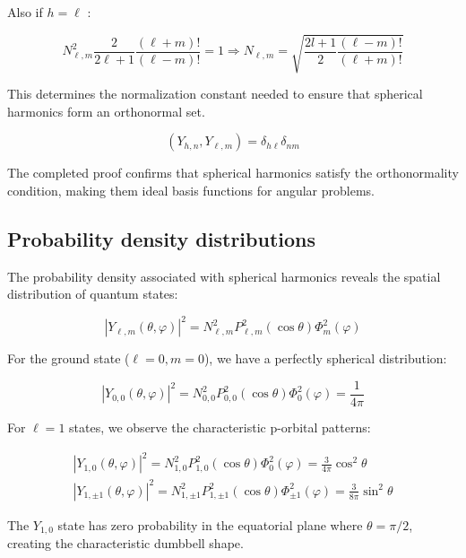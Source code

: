 \documentclass[italian]{HKNdocument}
\begin{document}
Also if $h=\ell$ :

\begin{equation}
N_{\ell, m}^{2} \frac{2}{2 \ell+1} \frac{(\ell+m)!}{(\ell-m)!}=1 \Longrightarrow N_{\ell, m}=\sqrt{\frac{2 l+1}{2} \frac{(\ell-m)!}{(\ell+m)!}}
\end{equation}

This determines the normalization constant needed to ensure that spherical harmonics form an orthonormal set.

\begin{equation}
\left(Y_{h, n}, Y_{\ell, m}\right)=\delta_{h \ell} \delta_{n m}
\end{equation}

The completed proof confirms that spherical harmonics satisfy the orthonormality condition, making them ideal basis functions for angular problems.

\subsection{Probability density distributions}
The probability density associated with spherical harmonics reveals the spatial distribution of quantum states:

\begin{equation}
\left|Y_{\ell, m}(\theta, \varphi)\right|^{2}=N_{\ell, m}^{2} P_{\ell, m}^{2}(\cos \theta) \Phi_{m}^{2}(\varphi)
\end{equation}

For the ground state ($\ell=0, m=0$), we have a perfectly spherical distribution:

\begin{equation}
\left|Y_{0,0}(\theta, \varphi)\right|^{2}=N_{0,0}^{2} P_{0,0}^{2}(\cos \theta) \Phi_{0}^{2}(\varphi)=\frac{1}{4 \pi}
\end{equation}

For $\ell=1$ states, we observe the characteristic p-orbital patterns:

\[
\begin{array}{r}
\left|Y_{1,0}(\theta, \varphi)\right|^{2}=N_{1,0}^{2} P_{1,0}^{2}(\cos \theta) \Phi_{0}^{2}(\varphi)=\frac{3}{4 \pi} \cos ^{2} \theta \\
\left|Y_{1, \pm 1}(\theta, \varphi)\right|^{2}=N_{1, \pm 1}^{2} P_{1, \pm 1}^{2}(\cos \theta) \Phi_{ \pm 1}^{2}(\varphi)=\frac{3}{8 \pi} \sin ^{2} \theta
\end{array}
\]

The $Y_{1,0}$ state has zero probability in the equatorial plane where $\theta=\pi/2$, creating the characteristic dumbbell shape.
\end{document}
